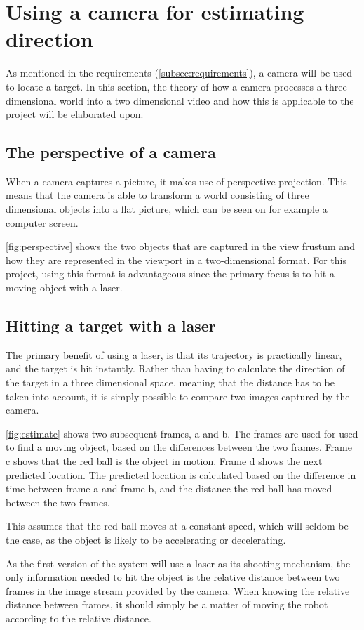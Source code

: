\section{Using a camera for estimating direction}
As mentioned in the requirements (\autoref{subsec:requirements}), a camera will be used to locate a target.
In this section, the theory of how a camera processes a three dimensional world into a two dimensional video and how this is applicable to the project will be elaborated upon.

\subsection{The perspective of a camera}
When a camera captures a picture, it makes use of perspective projection.
This means that the camera is able to transform a world consisting of three dimensional objects into a flat picture, which can be seen on for example a computer screen.


\autoref{fig:perspective} shows the two objects that are captured in the view frustum and how they are represented in the viewport in a two-dimensional format.
For this project, using this format is advantageous since the primary focus is to hit a moving object with a laser.

\subsection{Hitting a target with a laser}
The primary benefit of using a laser, is that its trajectory is practically linear, and the target is hit instantly.
Rather than having to calculate the direction of the target in a three dimensional space, meaning that the distance has to be taken into account, it is simply possible to compare two images captured by the camera.

\autoref{fig:estimate} shows two subsequent frames, a and b.
The frames are used for used to find a moving object, based on the differences between the two frames.
Frame c shows that the red ball is the object in motion.
Frame d shows the next predicted location.
The predicted location is calculated based on the difference in time between frame a and frame b, and the distance the red ball has moved between the two frames.

This assumes that the red ball moves at a constant speed, which will seldom be the case, as the object is likely to be accelerating or decelerating.

As the first version of the system will use a laser as its shooting mechanism, the only information needed to hit the object is the relative distance between two frames in the image stream provided by the camera. 
When knowing the relative distance between frames, it should simply be a matter of moving the robot according to the relative distance.
